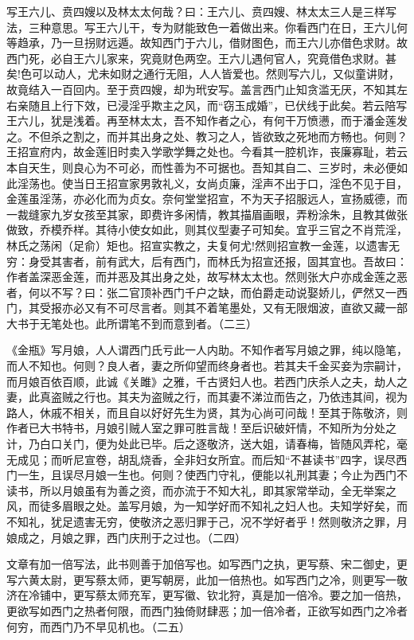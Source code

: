 {写王六儿、贲四嫂以及林太太何哉？曰：王六儿、贲四嫂、林太太三人是三样写法，三种意思。写王六儿干，专为财能致色一着做出来。你看西门在日，王六儿何等趋承，乃一旦拐财远遁。故知西门于六儿，借财图色，而王六儿亦借色求财。故西门死，必自王六儿家来，究竟财色两空。王六儿遇何官人，究竟借色求财。甚矣!色可以动人，尤未如财之通行无阻，人人皆爱也。然则写六儿，又似童讲财，故竟结入一百回内。至于贲四嫂，却为玳安写。盖言西门止知贪滥无厌，不知其左右亲随且上行下效，已浸淫乎欺主之风，而“窃玉成婚”，已伏线于此矣。若云陪写王六儿，犹是浅着。再至林太太，吾不知作者之心，有何干万愤懑，而于潘金莲发之。不但杀之割之，而并其出身之处、教习之人，皆欲致之死地而方畅也。何则？王招宣府内，故金莲旧时卖入学歌学舞之处也。今看其一腔机诈，丧廉寡耻，若云本自天生，则良心为不可必，而性善为不可据也。吾知其自二、三岁时，未必便如此淫荡也。使当日王招宣家男敦礼义，女尚贞廉，淫声不出于口，淫色不见于目，金莲虽淫荡，亦必化而为贞女。奈何堂堂招宣，不为天子招服远人，宣扬威德，而一裁缝家九岁女孩至其家，即费许多闲情，教其描眉画眼，弄粉涂朱，且教其做张做致，乔模乔样。其待小使女如此，则其仪型妻子可知矣。宜乎三官之不肖荒淫，林氏之荡闲（足俞）矩也。招宣实教之，夫复何尤!然则招宣教一金莲，以遗害无穷：身受其害者，前有武大，后有西门，而林氏为招宣还报，固其宜也。吾故曰：作者盖深恶金莲，而并恶及其出身之处，故写林太太也。然则张大户亦成金莲之恶者，何以不写？曰：张二官顶补西门千户之缺，而伯爵走动说娶娇儿，俨然又一西门，其受报亦必又有不可尽言者。则其不着笔墨处，又有无限烟波，直欲又藏一部大书于无笔处也。此所谓笔不到而意到者。（二三）

《金瓶》写月娘，人人谓西门氏亏此一人内助。不知作者写月娘之罪，纯以隐笔，而人不知也。何则？良人者，妻之所仰望而终身者也。若其夫千金买妾为宗嗣计，而月娘百依百顺，此诚《关雎》之雅，千古贤妇人也。若西门庆杀人之夫，劫人之妻，此真盗贼之行也。其夫为盗贼之行，而其妻不涕泣而告之，乃依违其间，视为路人，休戚不相关，而且自以好好先生为贤，其为心尚可问哉！至其于陈敬济，则作者已大书特书，月娘引贼人室之罪可胜言哉！至后识破奸情，不知所为分处之计，乃白口关门，便为处此已毕。后之逐敬济，送大姐，请春梅，皆随风弄柁，毫无成见；而听尼宣卷，胡乱烧香，全非妇女所宜。而后知“不甚读书”四字，误尽西门一生，且误尽月娘一生也。何则？使西门守礼，便能以礼刑其妻；今止为西门不读书，所以月娘虽有为善之资，而亦流于不知大礼，即其家常举动，全无举案之风，而徒多眉眼之处。盖写月娘，为一知学好而不知礼之妇人也。夫知学好矣，而不知礼，犹足遗害无穷，使敬济之恶归罪于己，况不学好者乎！然则敬济之罪，月娘成之，月娘之罪，西门庆刑于之过也。（二四）

文章有加一倍写法，此书则善于加倍写也。如写西门之执，更写蔡、宋二御史，更写六黄太尉，更写蔡太师，更写朝房，此加一倍热也。如写西门之冷，则更写一敬济在冷铺中，更写蔡太师充军，更写徽、钦北狩，真是加一倍冷。要之加一倍热，更欲写如西门之热者何限，而西门独倚财肆恶；加一倍冷者，正欲写如西门之冷者何穷，而西门乃不早见机也。（二五）

}
